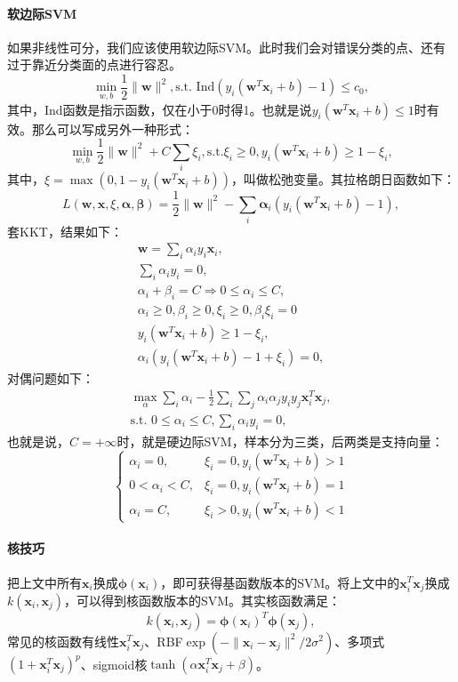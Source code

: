 \paragraph{软边际SVM} 如果非线性可分，我们应该使用软边际SVM。此时我们会对错误分类的点、还有过于靠近分类面的点进行容忍。
$$\min_{w,b} \frac{1}{2}\|\bm w\|^2, \text{s.t. } \mathrm{Ind}(y_i(\bm w^T\bm x_i + b) - 1) \le c_0,$$
其中，Ind函数是指示函数，仅在小于0时得1。也就是说$y_i(\bm w^T\bm x_i + b) \le 1$时有效。那么可以写成另外一种形式：
$$
\min_{w,b} \frac{1}{2}\|\bm w\|^2 + C\sum_i \xi_i, \text{s.t.}\xi_i \ge 0, y_i(\bm w^T\bm x_i + b) \ge 1 - \xi_i,
$$
其中，$\xi = \max(0, 1-y_i(\bm w^T\bm x_i + b))$，叫做松弛变量。其拉格朗日函数如下：
$$
L(\bm w, \bm x, \xi, \bm \alpha, \bm \beta) = \frac{1}{2}\|\bm w\|^2 - \sum_i \bm \alpha_i(y_i(\bm w^T\bm x_i + b) - 1),
$$
套KKT，结果如下：
$$
\begin{array}{l}
\bm w = \sum_i \alpha_iy_i\bm x_i, \\
\sum_i \alpha_iy_i = 0, \\
\alpha_i + \beta_i = C \Rightarrow 0 \le \alpha_i \le C, \\
\alpha_i \ge 0, \beta_i \ge 0, \xi_i \ge 0, \beta_i\xi_i = 0\\
y_i(\bm w^T\bm x_i + b) \ge 1 - \xi_i, \\
\alpha_i(y_i(\bm w^T\bm x_i + b) - 1 + \xi_i) = 0, 
\end{array}
$$
对偶问题如下：
$$
\begin{array}{l}
\max_\alpha \sum_i\alpha_i - \frac{1}{2} \sum_i\sum_j\alpha_i\alpha_jy_iy_j\bm{x}_i^T\bm{x}_j, \\
\text{s.t. }0 \le \alpha_i \le C, \sum_i \alpha_i y_i = 0,
\end{array}
$$
也就是说，$C = +\infty$时，就是硬边际SVM，样本分为三类，后两类是支持向量：
$$
\left\{
\begin{array}{ll}
\alpha_i = 0, & \xi_i = 0, y_i(\bm w^T\bm x_i + b) > 1 \\
0 < \alpha_i < C, & \xi_i = 0, y_i(\bm w^T\bm x_i + b) = 1 \\
\alpha_i = C, & \xi_i > 0, y_i(\bm w^T\bm x_i + b) < 1
\end{array}
\right.
$$
\paragraph{核技巧}
把上文中所有$\bm x_i$换成$\bm\phi(\bm x_i)$，即可获得基函数版本的SVM。将上文中的$\bm{x}_i^T\bm{x}_j$换成$k(\bm x_i, \bm x_j)$，可以得到核函数版本的SVM。其实核函数满足：
$$k(\bm x_i, \bm x_j) = \bm\phi(\bm x_i)^T\bm\phi(\bm x_j),$$
常见的核函数有线性$\bm x_i^T\bm x_j$、RBF$\exp(-\|\bm x_i - \bm x_j\|^2/2\sigma^2)$、多项式$(1+\bm x_i^T\bm x_j)^p$、sigmoid核$\tanh(\alpha\bm x_i^T\bm x_j+\beta)$。

